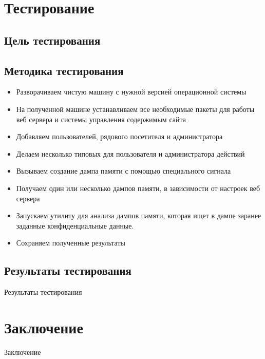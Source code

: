 \documentclass[20pt]{article}
\begin{document}
\section{Тестирование}

\subsection{Цель тестирования}

\subsection{Методика тестирования}

\begin{itemize}
  \item Разворачиваем чистую машину с нужной версией операционной системы
  \item На полученной машине устанавливаем все необходимые пакеты для работы
  веб сервера и системы управления содержимым сайта
  \item Добавляем пользователей, рядового посетителя и администратора
  \item Делаем несколько типовых для пользователя и администратора действий
  \item Вызываем создание дампа памяти с помощью специального сигнала
  \item Получаем один или несколько дампов памяти, в зависимости от настроек
  веб сервера
  \item Запускаем утилиту для анализа дампов памяти, которая ищет в дампе
  заранее заданные конфиденциальные данные.
  \item Сохраняем полученные результаты
\end{itemize}

\subsection{Результаты тестирования}
Результаты тестирования

\newpage

\section{Заключение}
Заключение

\newpage



\end{document}
